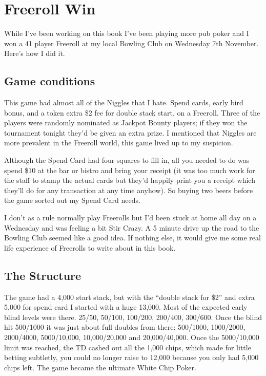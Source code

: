 \chapter{Freeroll Win}


While I've been working on this book I've been playing more
pub poker and I won a 41 player Freeroll at my local
Bowling Club on Wednesday 7th November. Here's how I
did it.

\section{Game conditions}

This game had almost all of the Niggles that I hate.
Spend cards, early bird bonus, and a token extra \$2 fee
for double stack start, on a Freeroll. Three of the players
were randomly nominated as Jackpot Bounty players; if they won the
tournament tonight they'd be given an extra prize.
I mentioned that Niggles are more prevalent in the Freeroll world, this
game lived up to my suspicion.

Although the Spend Card had four squares to fill in, all you
needed to do was spend \$10 at the bar or bistro and bring your
receipt (it was too much work for the staff to stamp the actual
cards but they'd happily print you a receipt which they'll do
for any transaction at any time anyhow). So buying two beers
before the game sorted out my Spend Card needs.

I don't as a rule normally play Freerolls but I'd been stuck
at home all day on a Wednesday and was feeling a bit Stir Crazy.
A 5 minute drive up the road to the Bowling Club seemed like
a good idea. If nothing else, it would give me some real life
experience of Freerolls to write about in this book.

\section{The Structure}

The game had a 4,000 start stack, but with the ``double stack for \$2''
and extra 5,000 for spend card I started with a huge 13,000. Most of
the expected early blind levels were there. 25/50, 50/100, 100/200, 200/400,
300/600. Once the blind hit 500/1000 it was just about full doubles
from there: 500/1000, 1000/2000, 2000/4000, 5000/10,000, 10,000/20,000
and 20,000/40,000. Once the 5000/10,000 limit was reached, the TD cashed out
all the 1,000 chips, which made for little betting subtletly, you could
no longer raise to 12,000 because you only had 5,000 chips left. The game
became the ultimate White Chip Poker.

